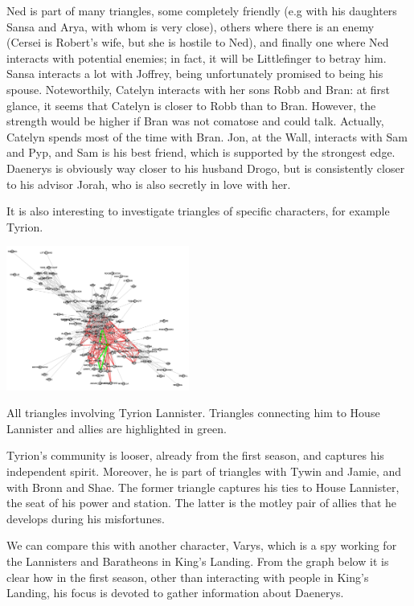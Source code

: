 \documentclass[10pt,twocolumn,letterpaper]{article}
\begin{document}
Ned is part of many triangles, some completely friendly (e.g with his daughters Sansa and Arya, with whom is very close), others where there is an enemy (Cersei is Robert's wife, but she is hostile to Ned), and finally one where Ned interacts with potential enemies; in fact, it will be Littlefinger to betray him. Sansa interacts a lot with Joffrey, being unfortunately promised to being his spouse.
Noteworthily, Catelyn interacts with her sons Robb and Bran: at first glance, it seems that Catelyn is closer to Robb than to Bran. However, the strength would be higher if Bran was not comatose and could talk. Actually, Catelyn spends most of the time with Bran.
Jon, at the Wall, interacts with Sam and Pyp, and Sam is his best friend, which is supported by the strongest edge.
Daenerys is obviously way closer to his husband Drogo, but is consistently closer to his advisor Jorah, who is also secretly in love with her.

It is also interesting to investigate triangles of specific characters, for example Tyrion.

\begin{center}
    \includegraphics[width=0.45\textwidth]{img/s1/triangles_tyrion.jpg}
    \caption{\small{All triangles involving Tyrion Lannister. Triangles connecting him to House Lannister and allies are highlighted in green.}}
\end{center}

Tyrion's community is looser, already from the first season, and captures his independent spirit. Moreover, he is part of triangles with Tywin and Jamie, and with Bronn and Shae. The former triangle captures his ties to House Lannister, the seat of his power and station. The latter is the motley pair of allies that he develops during his misfortunes.

We can compare this with another character, Varys, which is a spy working for the Lannisters and Baratheons in King's Landing. From the graph below it is clear how in the first season, other than interacting with people in King's Landing, his focus is devoted to gather information about Daenerys. 
\end{document}
